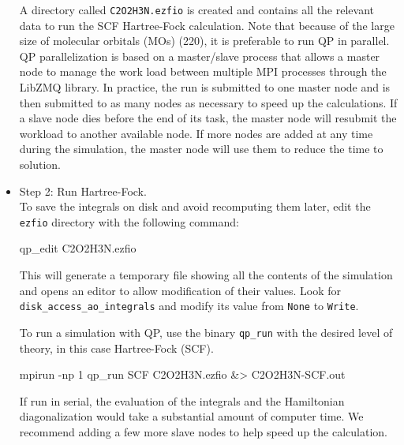 \begin{itemize}
A directory called \texttt{C2O2H3N.ezfio} is created and contains all the relevant data to run the SCF Hartree-Fock calculation. Note that because of the large size of molecular orbitals (MOs) (220), it is preferable to run QP in parallel. QP parallelization is based on a master/slave process that allows a master node to manage the work load between multiple MPI processes through the LibZMQ library. In practice, the run is submitted to one master node and is then submitted to as many nodes as necessary to speed up the calculations. If a slave node dies before the end of its task, the master node will resubmit the workload to another available node. If more nodes are added at any time during the simulation, the master node will use them to reduce the time to solution.
\item Step 2: Run Hartree-Fock.\\
To save the integrals on disk and avoid recomputing them later, edit the \texttt{ezfio} directory with the following command:\\
\begin{shade}
qp_edit C2O2H3N.ezfio 
\end{shade}

This will generate a temporary file showing all the contents of the simulation and opens an editor to allow modification of their values. Look for \texttt{disk\_access\_ao\_integrals} and modify its value from \texttt{None} to \texttt{Write}.

To run a simulation with QP, use the binary \texttt{qp\_run} with the desired level of theory, in this case Hartree-Fock (SCF). \\
\begin{shade}
mpirun -np 1 qp_run SCF C2O2H3N.ezfio &> C2O2H3N-SCF.out 
\end{shade}

If run in serial, the evaluation of the integrals and the Hamiltonian diagonalization would take a substantial amount of computer time. We recommend adding a few more slave nodes to help speed up the calculation.\\


\end{itemize}
